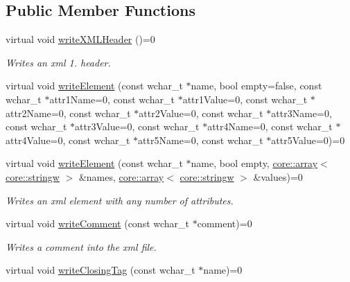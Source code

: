 \subsection*{Public Member Functions}
\begin{DoxyCompactItemize}
\item 
virtual void \hyperlink{classirr_1_1io_1_1IXMLWriter_a66fd00f6528fc967e53ea2a83f4fbf09}{write\+X\+M\+L\+Header} ()=0
\begin{DoxyCompactList}\small\item\em Writes an xml 1. header. \end{DoxyCompactList}\item 
virtual void \hyperlink{classirr_1_1io_1_1IXMLWriter_a09ffde58db20f23b7eba1bf08e1daf42}{write\+Element} (const wchar\+\_\+t $\ast$name, bool empty=false, const wchar\+\_\+t $\ast$attr1\+Name=0, const wchar\+\_\+t $\ast$attr1\+Value=0, const wchar\+\_\+t $\ast$attr2\+Name=0, const wchar\+\_\+t $\ast$attr2\+Value=0, const wchar\+\_\+t $\ast$attr3\+Name=0, const wchar\+\_\+t $\ast$attr3\+Value=0, const wchar\+\_\+t $\ast$attr4\+Name=0, const wchar\+\_\+t $\ast$attr4\+Value=0, const wchar\+\_\+t $\ast$attr5\+Name=0, const wchar\+\_\+t $\ast$attr5\+Value=0)=0
\item 
virtual void \hyperlink{classirr_1_1io_1_1IXMLWriter_a78bbf9835512bb404c34339c1a34ea31}{write\+Element} (const wchar\+\_\+t $\ast$name, bool empty, \hyperlink{classirr_1_1core_1_1array}{core\+::array}$<$ \hyperlink{namespaceirr_1_1core_aef83fafbb1b36fcce44c07c9be23a7f2}{core\+::stringw} $>$ \&names, \hyperlink{classirr_1_1core_1_1array}{core\+::array}$<$ \hyperlink{namespaceirr_1_1core_aef83fafbb1b36fcce44c07c9be23a7f2}{core\+::stringw} $>$ \&values)=0\hypertarget{classirr_1_1io_1_1IXMLWriter_a78bbf9835512bb404c34339c1a34ea31}{}\label{classirr_1_1io_1_1IXMLWriter_a78bbf9835512bb404c34339c1a34ea31}

\begin{DoxyCompactList}\small\item\em Writes an xml element with any number of attributes. \end{DoxyCompactList}\item 
virtual void \hyperlink{classirr_1_1io_1_1IXMLWriter_af6de322540d69764bd33a384763babd1}{write\+Comment} (const wchar\+\_\+t $\ast$comment)=0\hypertarget{classirr_1_1io_1_1IXMLWriter_af6de322540d69764bd33a384763babd1}{}\label{classirr_1_1io_1_1IXMLWriter_af6de322540d69764bd33a384763babd1}

\begin{DoxyCompactList}\small\item\em Writes a comment into the xml file. \end{DoxyCompactList}\item 
virtual void \hyperlink{classirr_1_1io_1_1IXMLWriter_a904c931fe03455eee04fcf41ef519715}{write\+Closing\+Tag} (const wchar\+\_\+t $\ast$name)=0\hypertarget{classirr_1_1io_1_1IXMLWriter_a904c931fe03455eee04fcf41ef519715}{}\label{classirr_1_1io_1_1IXMLWriter_a904c931fe03455eee04fcf41ef519715}


\end{DoxyCompactItemize}
